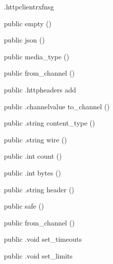 \begin{CrexxClass}{.httpclient}{rxfnsg}

  \begin{Hierarchy}
  \end{Hierarchy}

  \begin{Members}

    \Factory
      {public}
      {empty}
      {()}

    \Factory
      {public}
      {json}
      {()}

    \Factory
      {public}
      {media\_type}
      {()}

    \Factory
      {public}
      {from\_channel}
      {()}

    \Method
      {public}
      {.httpheaders}
      {add}
      {}

    \Method
      {public}
      {.channelvalue}
      {to\_channel}
      {()}

    \Method
      {public}
      {.string}
      {content\_type}
      {()}

    \Method
      {public}
      {.string}
      {wire}
      {()}

    \Method
      {public}
      {.int}
      {count}
      {()}

    \Method
      {public}
      {.int}
      {bytes}
      {()}

    \Method
      {public}
      {.string}
      {header}
      {()}

    \Factory
      {public}
      {safe}
      {()}

    \Factory
      {public}
      {from\_channel}
      {()}

    \Method
      {public}
      {.void}
      {set\_timeouts}
      {}

    \Method
      {public}
      {.void}
      {set\_limits}
      {}


\end{Members}
\end{CrexxClass}
